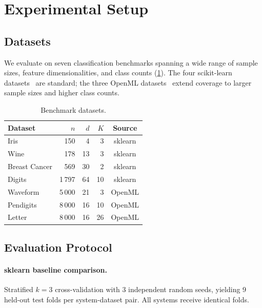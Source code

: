 \documentclass{article}
\theoremstyle{definition}
\theoremstyle{plain}
\theoremstyle{remark}
\begin{document}
\section{Experimental Setup}
\label{sec:experiments}

\subsection{Datasets}

We evaluate on seven classification benchmarks spanning a wide range of
sample sizes, feature dimensionalities, and class counts (\cref{tab:datasets}).
The four scikit-learn datasets~\cite{pedregosa2011scikit} are standard; the
three OpenML datasets~\cite{vanschoren2014openml} extend coverage to larger
sample sizes and higher class counts.

\begin{table}[t]
  \caption{Benchmark datasets.}
  \label{tab:datasets}
  \vskip 0.05in
  \begin{center}
    \begin{small}
      \begin{tabular}{lrrrc}
        \toprule
        Dataset       & $n$    & $d$  & $K$ & Source \\
        \midrule
        Iris          & 150    & 4    & 3   & sklearn \\
        Wine          & 178    & 13   & 3   & sklearn \\
        Breast Cancer & 569    & 30   & 2   & sklearn \\
        Digits        & 1\,797 & 64   & 10  & sklearn \\
        Waveform      & 5\,000 & 21   & 3   & OpenML  \\
        Pendigits     & 8\,000 & 16   & 10  & OpenML  \\
        Letter        & 8\,000 & 16   & 26  & OpenML  \\
        \bottomrule
      \end{tabular}
    \end{small}
  \end{center}
  \vskip -0.1in
\end{table}

\subsection{Evaluation Protocol}

\paragraph{sklearn baseline comparison.}
Stratified $k=3$ cross-validation with 3 independent random seeds,
yielding 9 held-out test folds per system-dataset pair.
All systems receive identical folds.
\end{document}
